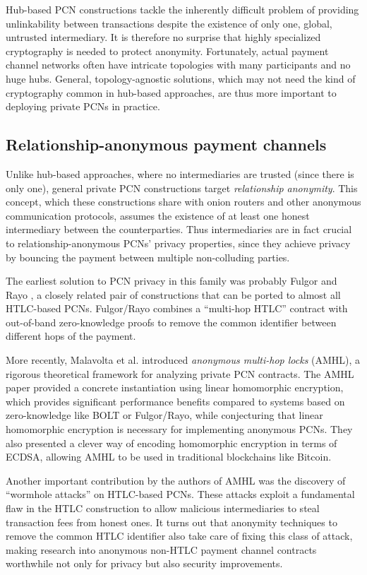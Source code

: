 \documentclass[USenglish,oneside,twocolumn]{article}
\begin{document}
Hub-based PCN constructions tackle the inherently difficult problem of providing unlinkability between transactions despite the existence of only one, global, untrusted intermediary. It is therefore no surprise that highly specialized cryptography is needed to protect anonymity. Fortunately, actual payment channel networks often have intricate topologies with many participants and no huge hubs. General, topology-agnostic solutions, which may not need the kind of cryptography common in hub-based approaches, are thus more important to deploying private PCNs in practice.

\subsection{Relationship-anonymous payment channels}

Unlike hub-based approaches, where no intermediaries are trusted (since there is only one), general private PCN constructions target \emph{relationship anonymity}. This concept, which these constructions share with onion routers and other anonymous communication protocols, assumes the existence of at least one honest intermediary between the counterparties. Thus intermediaries are in fact crucial to relationship-anonymous PCNs' privacy properties, since they achieve privacy by bouncing the payment between multiple non-colluding parties.

The earliest solution to PCN privacy in this family was probably Fulgor and Rayo \cite{malavolta2017concurrency}, a closely related pair of constructions that can be ported to almost all HTLC-based PCNs. Fulgor/Rayo combines a ``multi-hop HTLC'' contract with out-of-band zero-knowledge proofs to remove the common identifier between different hops of the payment.

More recently, Malavolta et al. \cite{malavolta2019anonymous} introduced \emph{anonymous multi-hop locks} (AMHL), a rigorous theoretical framework for analyzing private PCN contracts. The AMHL paper provided a concrete instantiation using linear homomorphic encryption, which provides significant performance benefits compared to systems based on zero-knowledge like BOLT or Fulgor/Rayo, while conjecturing that linear homomorphic encryption is necessary for implementing anonymous PCNs. They also presented a clever way of encoding homomorphic encryption in terms of ECDSA, allowing AMHL to be used in traditional blockchains like Bitcoin.

Another important contribution by the authors of AMHL was the discovery of ``wormhole attacks'' on HTLC-based PCNs. These attacks exploit a fundamental flaw in the HTLC construction to allow malicious intermediaries to steal transaction fees from honest ones. It turns out that anonymity techniques to remove the common HTLC identifier also take care of fixing this class of attack, making research into anonymous non-HTLC payment channel contracts worthwhile not only for privacy but also security improvements.
\end{document}
